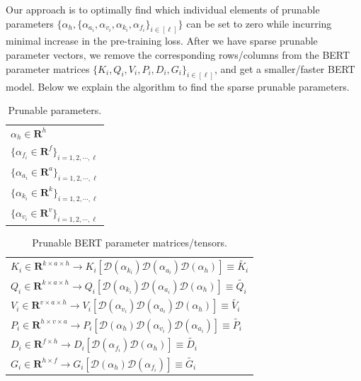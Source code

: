 \documentclass[11pt,a4paper]{article}
\begin{document}
Our approach is to optimally find which individual elements of prunable parameters $\{\alpha_h,\{\alpha_{a_i}, \alpha_{v_i}, \alpha_{k_i},  \alpha_{f_i}\}_{i \in [\ell]} \}$ can be set to zero while incurring minimal increase in the pre-training loss. After we have sparse prunable parameter vectors, we remove the corresponding rows/columns from the BERT parameter matrices $\{K_i, Q_i, V_i, P_i, D_i, G_i\}_{i \in [\ell]}$, and get a smaller/faster BERT model. Below we explain the algorithm to find the sparse prunable parameters. 
\begin{table}
\begin{center}
\begin{tabular}{l}
$\alpha_h \in \mathbf{R}^{h}$ \\
$\{\alpha_{f_i} \in \mathbf{R}^{f} \}_{i=1,2,\cdots,\ell}$\\
$\{\alpha_{a_i} \in \mathbf{R}^{a}\}_{i=1,2,\cdots,\ell}$\\
$\{\alpha_{k_i} \in \mathbf{R}^{k}\}_{i=1,2,\cdots,\ell}$\\
$\{\alpha_{v_i} \in \mathbf{R}^{v} \}_{i=1,2,\cdots,\ell}$
\end{tabular}
\end{center}
\caption{\label{tab:prune1} Prunable parameters.}
\end{table}
\begin{table}
\begin{center}
\begin{tabular}{l}
$K_i \in \mathbf{R}^{k\times a \times h} \rightarrow K_i[\mathcal{D}(\alpha_{k_i}) \mathcal{D}(\alpha_{a_i}) \mathcal{D}(\alpha_{h})] \equiv \widetilde{K_i}$ \\
$Q_i \in \mathbf{R}^{k\times a \times h} \rightarrow Q_i[\mathcal{D}(\alpha_{k_i}) \mathcal{D}(\alpha_{a_i})  \mathcal{D}(\alpha_{h})] \equiv \widetilde{Q_i}$ \\
$V_i \in \mathbf{R}^{v\times a \times h} \rightarrow V_i[ \mathcal{D}(\alpha_{v_i}) \mathcal{D}(\alpha_{a_i})   \mathcal{D}(\alpha_{h})] \equiv \widetilde{V_i}$ \\
$P_i \in \mathbf{R}^{h \times v\times a} \rightarrow P_i[ \mathcal{D}(\alpha_{h})  \mathcal{D}(\alpha_{v_i}) \mathcal{D}(\alpha_{a_i})] \equiv \widetilde{P_i}$ \\
$D_i \in \mathbf{R}^{f \times h} \rightarrow  D_i[\mathcal{D}(\alpha_{f_i}) \mathcal{D}(\alpha_{h})] \equiv \widetilde{D_i}$ \\
$G_i \in \mathbf{R}^{h \times f} \rightarrow G_i [\mathcal{D}(\alpha_{h}) \mathcal{D}(\alpha_{f_i})] \equiv \widetilde{G_i}$ \\
\end{tabular}
\end{center}
\caption{\label{tab:prune2} Prunable BERT parameter matrices/tensors.}
\end{table}
\end{document}
